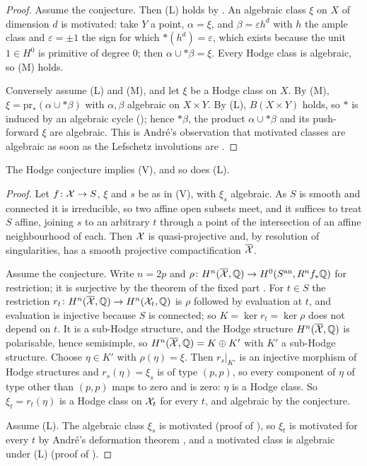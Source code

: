 \begin{proof}
Assume the conjecture. Then \textup{(L)} holds by . An
algebraic class $\xi$ on $X$ of dimension $d$ is motivated: take $Y$ a point,
$\alpha=\xi$, and $\beta=\varepsilon h^{d}$ with $h$ the ample class and
$\varepsilon=\pm1$ the sign for which ${*}(h^{d})=\varepsilon$, which exists
because the unit $1\in H^{0}$ is primitive of degree $0$; then
$\alpha\cup{*}\beta=\xi$. Every Hodge class is algebraic, so \textup{(M)}
holds.

Conversely assume \textup{(L)} and \textup{(M)}, and let $\xi$ be a Hodge
class on $X$. By \textup{(M)}, $\xi=\mathrm{pr}_{*}(\alpha\cup{*}\beta)$ with
$\alpha,\beta$ algebraic on $X\times Y$. By \textup{(L)}, $B(X\times Y)$
holds, so ${*}$ is induced by an algebraic cycle
(); hence ${*}\beta$, the product
$\alpha\cup{*}\beta$ and its push-forward $\xi$ are algebraic. This is
Andr\'e's observation that motivated classes are algebraic as soon as the
Lefschetz involutions are \cite[\S2.1]{And96b}.
\end{proof}

\begin{proposition}\label{prop:lefvhc}
The Hodge conjecture implies \textup{(V)}, and so does \textup{(L)}.
\end{proposition}

\begin{proof}
Let $f\colon\mathcal{X}\to S$, $\xi$ and $s$ be as in \textup{(V)}, with $\xi_{s}$
algebraic. As $S$ is smooth and connected it is irreducible, so two affine
open subsets meet, and it suffices to treat $S$ affine, joining $s$ to an
arbitrary $t$ through a point of the intersection of an affine neighbourhood
of each. Then $\mathcal{X}$ is quasi-projective and, by resolution of singularities,
has a smooth projective compactification $\overline{\mathcal{X}}$.

Assume the conjecture. Write $n=2p$ and
$\rho\colon H^{n}(\overline{\mathcal{X}},\mathbb{Q})\to H^{0}(S^{\mathrm{an}},R^{n}f_{*}\mathbb{Q})$
for restriction; it is surjective by the theorem of the fixed part
\cite[4.1.1(ii)]{Del71}. For $t\in S$ the restriction
$r_{t}\colon H^{n}(\overline{\mathcal{X}},\mathbb{Q})\to H^{n}(\mathcal{X}_{t},\mathbb{Q})$ is $\rho$
followed by evaluation at $t$, and evaluation is injective because $S$ is
connected; so $K=\ker r_{t}=\ker\rho$ does not depend on $t$. It is a
sub-Hodge structure, and the Hodge structure $H^{n}(\overline{\mathcal{X}},\mathbb{Q})$ is
polarisable, hence semisimple, so $H^{n}(\overline{\mathcal{X}},\mathbb{Q})=K\oplus K'$
with $K'$ a sub-Hodge structure. Choose $\eta\in K'$ with $\rho(\eta)=\xi$.
Then $r_{s}|_{K'}$ is an injective morphism of Hodge structures and
$r_{s}(\eta)=\xi_{s}$ is of type $(p,p)$, so every component of $\eta$ of
type other than $(p,p)$ maps to zero and is zero: $\eta$ is a Hodge class.
So $\xi_{t}=r_{t}(\eta)$ is a Hodge class on $\mathcal{X}_{t}$ for every $t$, and
algebraic by the conjecture.

Assume \textup{(L)}. The algebraic class $\xi_{s}$ is motivated (proof of
), so $\xi_{t}$ is motivated for every $t$ by Andr\'e's
deformation theorem \cite[Th\'eor\`eme~0.5]{And96b}, and a motivated class is
algebraic under \textup{(L)} (proof of ).
\end{proof}

